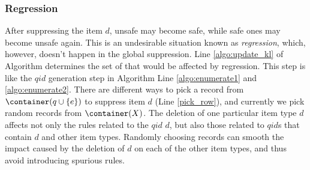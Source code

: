 \subsubsection{Regression}
After suppressing the item $d$, unsafe \qids may become safe, while safe ones
may become unsafe again.
This is an undesirable situation known as {\em regression}, which, however, doesn't happen in the global suppression.
Line \ref{algo:update_kl} of
Algorithm \SanitizeBuffer determines the set of
\qids that would be affected by regression. This step is like the $qid$
generation step in Algorithm \PartialSuppression Line \ref{algo:enumerate1}
and \ref{algo:enumerate2}. There are different ways to pick a
record from $\container(q\cup \{e\})$ to suppress item $d$ (Line
\ref{pick_row}), and currently we pick random records from $\container(X)$.
The deletion of one particular item type $d$ affects not only the rules
related to the $qid$ ${d}$, but also those related to $qid$s that
contain $d$ and other item types.
Randomly choosing records can smooth the impact caused by
the deletion of $d$ on each of the other item types,
and thus avoid introducing spurious rules.
